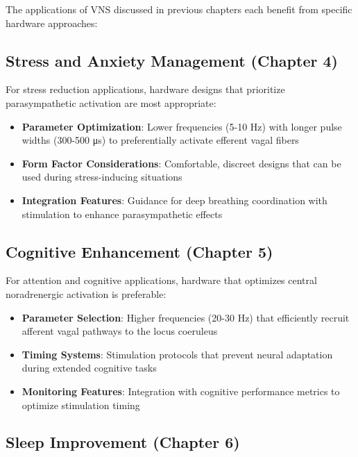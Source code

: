 \documentclass[
  Letterpaper,
]{scrbook}
\providecommand{\tightlist}{%
  \setlength{\itemsep}{0pt}\setlength{\parskip}{0pt}}\usepackage{longtable,booktabs,array}
\begin{document}
The applications of VNS discussed in previous chapters each benefit from
specific hardware approaches:

\subsection{Stress and Anxiety Management (Chapter
4)}\label{stress-and-anxiety-management-chapter-4}

For stress reduction applications, hardware designs that prioritize
parasympathetic activation are most appropriate:

\begin{itemize}
\tightlist
\item
  \textbf{Parameter Optimization}: Lower frequencies (5-10 Hz) with
  longer pulse widths (300-500 μs) to preferentially activate efferent
  vagal fibers
\item
  \textbf{Form Factor Considerations}: Comfortable, discreet designs
  that can be used during stress-inducing situations
\item
  \textbf{Integration Features}: Guidance for deep breathing
  coordination with stimulation to enhance parasympathetic effects
\end{itemize}

\subsection{Cognitive Enhancement (Chapter
5)}\label{cognitive-enhancement-chapter-5}

For attention and cognitive applications, hardware that optimizes
central noradrenergic activation is preferable:

\begin{itemize}
\tightlist
\item
  \textbf{Parameter Selection}: Higher frequencies (20-30 Hz) that
  efficiently recruit afferent vagal pathways to the locus coeruleus
\item
  \textbf{Timing Systems}: Stimulation protocols that prevent neural
  adaptation during extended cognitive tasks
\item
  \textbf{Monitoring Features}: Integration with cognitive performance
  metrics to optimize stimulation timing
\end{itemize}

\subsection{Sleep Improvement (Chapter
6)}\label{sleep-improvement-chapter-6}
\end{document}
